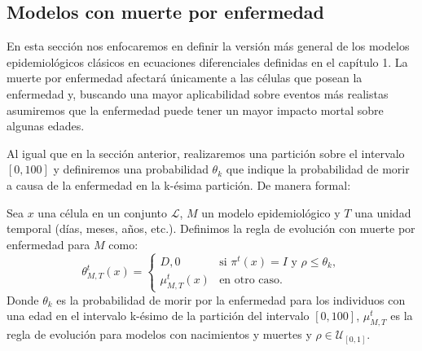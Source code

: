 \begin{example}

\end{example}

\subsection{Modelos con muerte por enfermedad}\label{sub:MuertePorEnfermedad}
En esta sección nos enfocaremos en definir la versión más general de los modelos epidemiológicos clásicos en ecuaciones diferenciales definidas en el capítulo 1. La muerte por enfermedad afectará únicamente a las células que posean la enfermedad y, buscando una mayor aplicabilidad sobre eventos más realistas asumiremos que la enfermedad puede tener un mayor impacto mortal sobre algunas edades. 

Al igual que en la sección anterior, realizaremos una partición sobre el intervalo $[0,100]$ y definiremos una probabilidad $\theta_k$ que indique la probabilidad de morir a causa de la enfermedad en la k-ésima partición. De manera formal:

\begin{definition}\label{def:reglaMuertePorEnfermedad}
Sea $x$ una célula en un conjunto $\mathcal{L}$, $M$ un modelo epidemiológico y $T$ una unidad temporal (días, meses, años, etc.). Definimos la regla de evolución con muerte por enfermedad para $M$ como:
\begin{equation}
    \theta_{M,T}^t(x)=\left\{\begin{array}{ll}
        D,0 & \text{si }\pi^t(x)=I\text{ y }\rho\leq\theta_k, \\
        \mu_{M,T}^t(x) & \text{en otro caso.}
    \end{array}\right.
\end{equation}
Donde $\theta_k$ es la probabilidad de morir por la enfermedad para los individuos con una edad en el intervalo k-ésimo de la partición del intervalo $[0,100]$, $\mu_{M,T}^t$ es la regla de evolución para modelos con nacimientos y muertes y $\rho\in\mathcal{U}_{[0,1]}$.
\end{definition}

